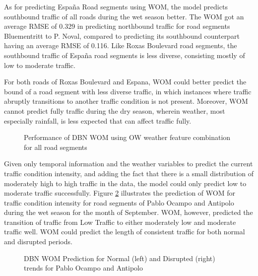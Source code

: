 As for predicting España Road segments using WOM, the model predicts southbound traffic of all roads during the wet season better. The WOM got an average RMSE of 0.329 in predicting northbound traffic for road segments Bluementritt to P. Noval, compared to predicting its southbound counterpart having an average RMSE of 0.116. Like Roxas Boulevard road segments, the southbound traffic of España road segments is less diverse, consisting mostly of low to moderate traffic.

For both roads of Roxas Boulevard and Espana, WOM could better predict the bound of a road segment with less diverse traffic, in which instances where traffic abruptly transitions to another traffic condition is not present. Moreover, WOM cannot predict fully traffic during the dry season, wherein weather, most especially rainfall, is less expected that can affect traffic fully. 


\begin{figure}[h]
  \centering
  \captionsetup{justification=centering}
  \caption{Performance of DBN WOM using OW weather feature combination for all road segments}
  \label{fig:wom_feat_combi_roads}
\end{figure}

Given only temporal information and the weather variables to predict the current traffic condition intensity, and adding the fact that there is a small distribution of moderately high to high traffic in the data, the model could only predict low to moderate traffic successfully. Figure \ref{fig:WOM_normal_disrption_pocampo_antipolo_wet} illustrates the prediction of WOM for traffic condition intensity for road segments of Pablo Ocampo and Antipolo during the wet season for the month of September. WOM, however, predicted the transition of traffic from Low Traffic to either moderately low and moderate traffic well. WOM could predict the length of consistent traffic for both normal and disrupted periods. 

\begin{figure}[h]
  \centering
  \captionsetup{justification=centering}
  \caption{DBN WOM Prediction for Normal (left) and Disrupted (right) trends for Pablo Ocampo and Antipolo}
  \label{fig:WOM_normal_disrption_pocampo_antipolo_wet}
\end{figure}

